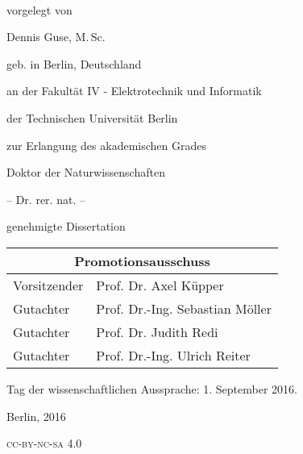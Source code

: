 \begin{titlepage}
    \begin{center}
        \large  

        \hfill

        \vfill

        \vspace{3cm}

        \begingroup
            \color{Maroon}\spacedallcaps{\myTitle} \\ \bigskip
        \endgroup

        \vspace{1.6cm}	
				vorgelegt von
				
				\vspace{0.7cm}	
				Dennis Guse, M.\,Sc. 
				
				geb. in Berlin, Deutschland



				\vspace{0.7cm}
				an der Fakultät IV - Elektrotechnik und Informatik
				
				der Technischen Universität Berlin
				
				zur Erlangung des akademischen Grades

				\vspace{0.7cm}
				Doktor der Naturwissenschaften
				
				-- Dr. rer. nat. --

				\vspace{0.7cm}
				genehmigte Dissertation
				\vspace{1.4cm}
				
				\centering
				\large
				\begin{tabular}{ll}
				\multicolumn{2}{c}{Promotionsausschuss} \\
				\hline				
				Vorsitzender  & Prof. Dr. Axel Küpper  \\
				Gutachter	& Prof. Dr.-Ing. Sebastian Möller \\
				Gutachter	& Prof. Dr. Judith Redi \\
				Gutachter	& Prof. Dr.-Ing. Ulrich Reiter \\
				\end{tabular}
			
				\vspace{0.7cm}
				Tag der wissenschaftlichen Aussprache: 1. September 2016.



				\vspace{1.4cm}
				Berlin, 2016

				\vspace{0.7cm}	
				\textsc{\MakeLowercase{CC-BY-NC-SA 4.0}}

        \vfill                      

    \end{center}  
\end{titlepage}   
